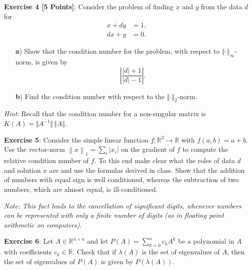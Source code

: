 \documentclass{article}
\begin{document}
\vspace{1\baselineskip}
\noindent\textsf{\textbf{Exercise 4 [5 Points]}}: Consider the problem of finding $x$ and $y$ from the data $d$ for
\begin{align*}
x + dy & = 1, \\
dx + y & = 0.
\end{align*}
\begin{itemize}
\item[\textsf{\textbf{a})}] Show that the condition number for the problem, with respect to $\left\Vert \cdot \right\Vert_{\infty}$-norm, is given by
\begin{equation*}
\left| \dfrac{ |d| + 1}{ | d | - 1} \right| .
\end{equation*}
\item[\textsf{\textbf{b})}] Find the condition number with respect to the $\left\Vert \cdot \right\Vert_{2}$-norm.
\end{itemize}
\textit{Hint}: Recall that the condition number for a non-singular matrix is $K\left(A\right) = \bigl\Vert A^{-1} \bigr\Vert \,  \left\Vert A \right\Vert$.


\vspace{1\baselineskip}
\noindent\textsf{\textbf{Exercise 5}}: Consider the simple linear function $f : \mathbb{R}^2 \rightarrow \mathbb{R}$ with $f(a, b) = a + b$. Use the vector-norm $\left\|x \right\|_1 = \sum_i | x_i |$ on the gradient of $f$ to compute the relative condition number of $f$. To this end make clear what the roles of data $d$ and solution $x$ are and use the formulas derived in class. Show that the addition of numbers with equal sign is well conditioned, whereas the subtraction of two numbers, which are almost equal, is ill-conditioned. 

\vspace{0.5\baselineskip}
\noindent\textit{\small\textcolor{gray!90!white}{Note: This fact leads to the cancellation of significant digits, whenever numbers can be represented with only a finite number of digits (as in floating point arithmetic on computers)}}.

\vspace{1\baselineskip}
\noindent\textsf{\textbf{Exercise 6}}: Let $A \in \mathbb{R}^{n\times n}$ and let ${P\left(A\right) = \sum_{k=0}^{n} c_k A^k}$ be a polynomial in $A$ with coefficients $c_k \in \mathbb{R}$. Check that if $\lambda\left(A\right)$ is the set of eigenvalues of $A$, then the set of eigenvalues of $P\left(A\right)$ is given by $P\left( \lambda\left(A\right)\right)$. 
\end{document}
